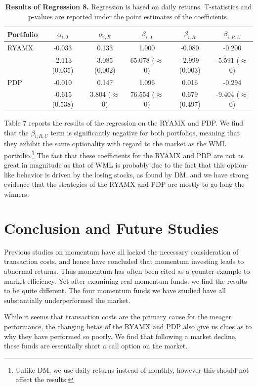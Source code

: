 \documentclass[12pt]{article}
\begin{document}
\begin{table}[t]
\centering
\caption{\textbf{Results of Regression 8.} \footnotesize{Regression is based on daily returns. T-statistics and p-values are reported under the point estimates of the coefficients.}}
\begin{tabular}{l | c | c | c | c | c }
\hline
Portfolio & $\alpha_{i,0}$ & $\alpha_{i,R}$ & $\beta_{i,0}$ & $\beta_{i,R}$ & $\beta_{i,R,U}$\\
\hline
RYAMX & -0.033 & 0.133 & 1.000 & -0.080 & -0.200 \\
 & -2.113 (0.035) & 3.085 (0.002) & 65.078 ($\approx$ 0) & -2.999 (0.003) & -5.591 ($\approx$ 0) \\
\hline
PDP & -0.010 & 0.147 & 1.096 & 0.016 & -0.294 \\
 & -0.615 (0.538) & 3.804 ($\approx$ 0) & 76.554 ($\approx$ 0) & 0.679 (0.497) & -9.404 ($\approx$ 0)\\
\end{tabular}
\end{table}

Table 7 reports the results of the regression on the RYAMX and PDP. We find that the $\beta_{i,R,U}$ term is significantly negative for both portfolios, meaning that they exhibit the same optionality with regard to the market as the WML portfolio.\footnote{Unlike DM, we use daily returns instead of monthly, however this should not affect the results.} The fact that these coefficients for the RYAMX and PDP are not as great in magnitude as that of WML is probably due to the fact that this option-like behavior is driven by the losing stocks, as found by DM, and we have strong evidence that the strategies of the RYAMX and PDP are mostly to go long the winners.

\section{Conclusion and Future Studies} %

Previous studies on momentum have all lacked the necessary consideration of transaction costs, and hence have concluded that momentum investing leads to abnormal returns. Thus momentum has often been cited as a counter-example to market efficiency. Yet after examining real momentum funds, we find the results to be quite different. The four momentum funds we have studied have all substantially underperformed the market. 

While it seems that transaction costs are the primary cause for the meager performance, the changing betas of the RYAMX and PDP also give us clues as to why they have performed so poorly. We find that following a market decline, these funds are essentially short a call option on the market.
\end{document}
